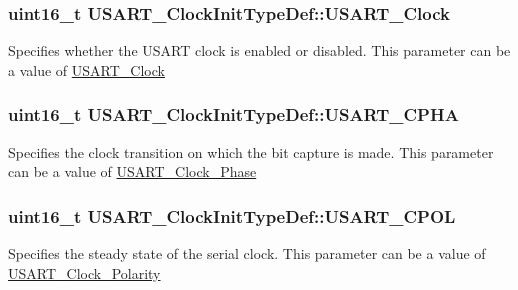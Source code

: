 \subsubsection[{\texorpdfstring{U\+S\+A\+R\+T\+\_\+\+Clock}{USART_Clock}}]{\setlength{\rightskip}{0pt plus 5cm}uint16\+\_\+t U\+S\+A\+R\+T\+\_\+\+Clock\+Init\+Type\+Def\+::\+U\+S\+A\+R\+T\+\_\+\+Clock}\hypertarget{struct_u_s_a_r_t___clock_init_type_def_a229ba7c3f9a4d6d56513e6899f6c6693}{}\label{struct_u_s_a_r_t___clock_init_type_def_a229ba7c3f9a4d6d56513e6899f6c6693}
Specifies whether the U\+S\+A\+RT clock is enabled or disabled. This parameter can be a value of \hyperlink{group___u_s_a_r_t___clock}{U\+S\+A\+R\+T\+\_\+\+Clock} 
\subsubsection[{\texorpdfstring{U\+S\+A\+R\+T\+\_\+\+C\+P\+HA}{USART_CPHA}}]{\setlength{\rightskip}{0pt plus 5cm}uint16\+\_\+t U\+S\+A\+R\+T\+\_\+\+Clock\+Init\+Type\+Def\+::\+U\+S\+A\+R\+T\+\_\+\+C\+P\+HA}\hypertarget{struct_u_s_a_r_t___clock_init_type_def_abda3a2172bd5819e1c207dc0d1c822d8}{}\label{struct_u_s_a_r_t___clock_init_type_def_abda3a2172bd5819e1c207dc0d1c822d8}
Specifies the clock transition on which the bit capture is made. This parameter can be a value of \hyperlink{group___u_s_a_r_t___clock___phase}{U\+S\+A\+R\+T\+\_\+\+Clock\+\_\+\+Phase} 
\subsubsection[{\texorpdfstring{U\+S\+A\+R\+T\+\_\+\+C\+P\+OL}{USART_CPOL}}]{\setlength{\rightskip}{0pt plus 5cm}uint16\+\_\+t U\+S\+A\+R\+T\+\_\+\+Clock\+Init\+Type\+Def\+::\+U\+S\+A\+R\+T\+\_\+\+C\+P\+OL}\hypertarget{struct_u_s_a_r_t___clock_init_type_def_a01450cba8a40cf9a624b25979dc6aa77}{}\label{struct_u_s_a_r_t___clock_init_type_def_a01450cba8a40cf9a624b25979dc6aa77}
Specifies the steady state of the serial clock. This parameter can be a value of \hyperlink{group___u_s_a_r_t___clock___polarity}{U\+S\+A\+R\+T\+\_\+\+Clock\+\_\+\+Polarity} 
